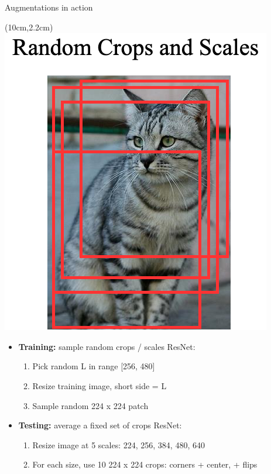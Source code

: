\documentclass[serif, aspectratio=169]{beamer}
\begin{document}
\begin{frame}{Augmentations in action}
	\begin{textblock*}{5cm}(10cm,2.2cm) %
		\includegraphics[keepaspectratio, scale=0.28]{pic/crop}
	\end{textblock*}

	\begin{itemize}
	\item \textbf{Training:} sample random crops / scales \newline ResNet:
		\begin{enumerate}
				\item Pick random L in range [256, 480]
				\item Resize training image, short side = L
				\item Sample random 224 x 224 patch
		\end{enumerate}
		
	\item \textbf{Testing:} average a fixed set of crops \newline ResNet:
		\begin{enumerate}
			\item Resize image at 5 scales: {224, 256, 384, 480, 640}
			\item For each size, use 10 224 x 224 crops:  corners + center, + flips
		\end{enumerate}				
	\end{itemize}
\end{frame}
\end{document}
